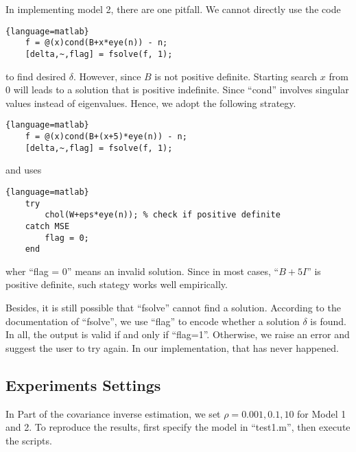 \documentclass[conference,onecolumn,12pt]{IEEEtran}
\newcommand{\<}{\langle}
\renewcommand{\>}{\rangle}
\numberwithin{equation}{section}
\begin{document}
In implementing model 2, there are one pitfall. We cannot directly use the code
\begin{lstlisting}{language=matlab}
    f = @(x)cond(B+x*eye(n)) - n;
    [delta,~,flag] = fsolve(f, 1);
\end{lstlisting}
to find desired $\delta$. However, since $B$ is not positive definite. Starting search $x$ from 0 will leads to a solution that is positive indefinite. Since ``cond'' involves singular values instead of eigenvalues. Hence, we adopt the following strategy.
\begin{lstlisting}{language=matlab}
    f = @(x)cond(B+(x+5)*eye(n)) - n;
    [delta,~,flag] = fsolve(f, 1);
\end{lstlisting}
and uses
\begin{lstlisting}{language=matlab}
    try
        chol(W+eps*eye(n)); % check if positive definite
    catch MSE
        flag = 0;
    end
\end{lstlisting}
wher ``flag = 0'' means an invalid solution. Since in most cases, ``$B+5I$'' is positive definite, such stategy works well empirically.

Besides, it is still possible that ``fsolve'' cannot find a solution. According to the documentation of ``fsolve'', we use ``flag'' to encode whether a solution $\delta$ is found. In all, the output is valid if and only if ``flag=1''. Otherwise, we raise an error and suggest the user to try again. In our implementation, that has never happened.

\subsection{Experiments Settings}
In Part \uppercase\expandafter{} of the covariance inverse estimation, we set $\rho=0.001,0.1,10$ for Model 1 and 2. To reproduce the results, first specify the model in ``test1.m'', then execute the scripts.
\end{document}
